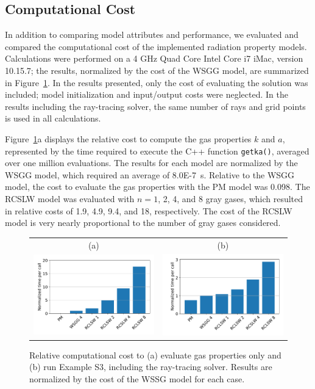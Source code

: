 \documentclass[preprint,12pt]{elsarticle}
\begin{document}

\subsection{Computational Cost} \label{s:cost}

In addition to comparing model attributes and performance, we evaluated and compared the computational cost of the implemented radiation property models. 
Calculations were performed on a 4 GHz Quad Core Intel Core i7 iMac, version 10.15.7; the results, normalized by the cost of the WSGG model, are summarized in Figure~\ref{f:cost}. 
In the results presented, only the cost of evaluating the solution was included; model initialization and input/output costs were neglected. In the results including the ray-tracing solver, the same number of rays and grid points is used in all calculations.

Figure~\ref{f:cost}a displays the relative cost to compute the gas properties $k$ and $a$, represented by the time required to execute the C++ function \texttt{get\textunderscore k\textunderscore a()}, averaged over one million evaluations. The results for each model are normalized by the WSGG model, which required an average of 8.0E-7~s. Relative to the WSGG model, the cost to evaluate the gas properties with the PM model was 0.098. The RCSLW model was evaluated with $n=1$, 2, 4, and 8 gray gases, which resulted in relative costs of 1.9, 4.9, 9.4, and 18, respectively. The cost of the RCSLW model is very nearly proportional to the number of gray gases considered.
%
\begin{figure}
    \begin{center}
    \begin{tabular}{c c}
        (a) & (b) \\
        \includegraphics[width=2.5 in]{fig_getka_c++.pdf} &
        \includegraphics[width=2.5 in]{fig_exS3_c++.pdf}
    \end{tabular}
    \caption{Relative computational cost to (a) evaluate gas properties only and (b) run Example S3, including the ray-tracing solver. Results are normalized by the cost of the WSSG model for each case.}
    \label{f:cost}
    \end{center}
\end{figure}
%
\end{document}
